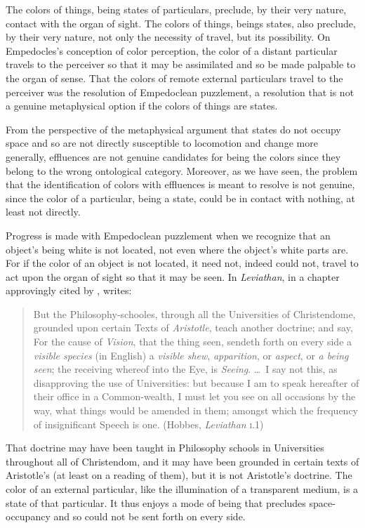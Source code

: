 The colors of things, being states of particulars, preclude, by their very nature, contact with the organ of sight. The colors of things, beings states, also preclude, by their very nature, not only the necessity of travel, but its possibility. On Empedocles's conception of color perception, the color of a distant particular travels to the perceiver so that it may be assimilated and so be made palpable to the organ of sense. That the colors of remote external particulars travel to the perceiver was the resolution of Empedoclean puzzlement, a resolution that is not a genuine metaphysical option if the colors of things are states. 

From the perspective of the metaphysical argument that states do not occupy space and so are not directly susceptible to locomotion and change more generally, effluences are not genuine candidates for being the colors since they belong to the wrong ontological category. Moreover, as we have seen, the problem that the identification of colors with effluences is meant to resolve is not genuine, since the color of a particular, being a state, could be in contact with nothing, at least not directly.

Progress is made with Empedoclean puzzlement when we recognize that an object's being white is not located, not even where the object's white parts are. For if the color of an object is not located, it need not, indeed could not, travel to act upon the organ of sight so that it may be seen. In \emph{Leviathan}, in a chapter approvingly cited by \citet[26 n7]{Burnyeat:1992fk}, \citet{Hobbes:1651fk} writes:
\begin{quote}
	But the Philosophy-schooles, through all the Universities of Christendome, grounded upon certain Texts of \emph{Aristotle}, teach another doctrine; and say, For the cause of \emph{Vision}, that the thing seen, sendeth forth on every side a \emph{visible species} (in English) a \emph{visible shew}, \emph{apparition}, or \emph{aspect}, or \emph{a being seen}; the receiving whereof into the Eye, is \emph{Seeing}. \ldots\ I say not this, as disapproving the use of Universities: but because I am to speak hereafter of their office in a Common-wealth, I must let you see on all occasions by the way, what things would be amended in them; amongst which the frequency of insignificant Speech is one. (Hobbes, \emph{Leviathan} \textsc{i}.1)
\end{quote}
That doctrine may have been taught in Philosophy schools in Universities throughout all of Christendom, and it may have been grounded in certain texts of Aristotle's (at least on a reading of them), but it is not Aristotle's doctrine. The color of an external particular, like the illumination of a transparent medium, is a state of that particular. It thus enjoys a mode of being that precludes space-occupancy and so could not be sent forth on every side.

